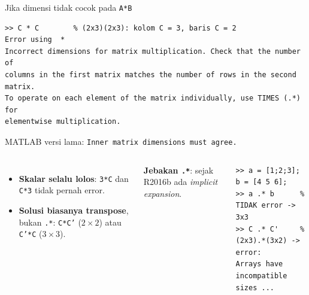 \documentclass[aspectratio=169,11pt]{beamer}
\begin{document}
\begin{frame}[fragile]{Jika dimensi tidak cocok pada \texttt{A*B}}
\begin{lstlisting}[basicstyle=\ttfamily\scriptsize, deletekeywords={for}]
>> C * C        % (2x3)(2x3): kolom C = 3, baris C = 2
Error using  *
Incorrect dimensions for matrix multiplication. Check that the number of
columns in the first matrix matches the number of rows in the second matrix.
To operate on each element of the matrix individually, use TIMES (.*) for
elementwise multiplication.
\end{lstlisting}
\scriptsize MATLAB versi lama: \texttt{Inner matrix dimensions must agree.}

\vspace{0.4em}
\begin{columns}[T]
\small
\begin{itemize}
  \item \textbf{Skalar selalu lolos}: \texttt{3*C} dan \texttt{C*3} tidak pernah error.
  \item \textbf{Solusi biasanya transpose}, bukan \texttt{.*}:
        \texttt{C*C'} ($2\times2$) atau \texttt{C'*C} ($3\times3$).
\end{itemize}
\small
\textcolor{baris}{\textbf{Jebakan \texttt{.*}}}: sejak R2016b ada
\emph{implicit expansion}.
\begin{lstlisting}[basicstyle=\ttfamily\scriptsize]
>> a = [1;2;3];  b = [4 5 6];
>> a .* b      % TIDAK error -> 3x3
>> C .* C'     % (2x3).*(3x2) -> error:
Arrays have incompatible sizes ...
\end{lstlisting}
\end{columns}
\end{frame}
\end{document}
